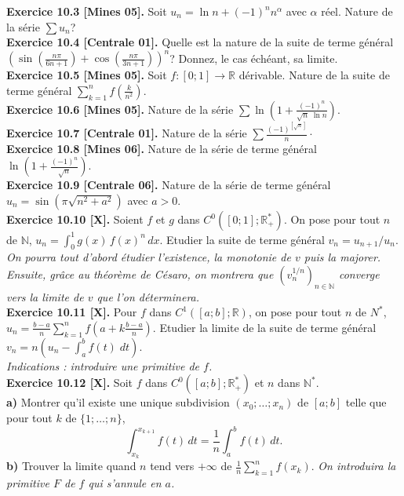 \documentclass[a4paper,12pt,francais]{article}
\newcommand{\field}[1]{\mathbb{#1}}
\newcommand{\N}{\field{N}}
\newcommand{\R}{\field{R}}
\begin{document}
\noindent
{\bf Exercice 10.3 [Mines 05].} Soit $u_n=\ln n+(-1)^nn^\alpha$ avec
$\alpha$ réel. Nature de la série $\sum u_n$?\\

\noindent
{\bf Exercice 10.4 [Centrale 01].} Quelle est la nature de la suite de
terme général 
$\left({
\sin \left({\frac{n\pi}{6n+1}}\right)
+\cos\left({\frac{n\pi}{3n+1}}\right)
}\right)^n$? Donnez, le cas échéant, sa limite.\\

\noindent
{\bf Exercice 10.5 [Mines 05].} Soit $f:[0;1] \rightarrow \R$
dérivable. Nature de la suite de terme général $\displaystyle 
\sum_{k=1}^n f\left({\frac{k}{n^2}}\right)$.\\

\noindent
{\bf Exercice 10.6 [Mines 05].} Nature de la série $\sum \ln \left({
1+\frac{(-1)^n}{\sqrt{n}\; \ln n}
}\right)$.\\

\noindent
{\bf Exercice 10.7 [Centrale 01].} Nature de la série $\sum \frac{(-1)^{[\sqrt{n}]}}{n}\cdot$\\

\noindent
{\bf Exercice 10.8 [Mines 06].} Nature de la série de terme général
$\ln \left(1+\frac{(-1)^n}{\sqrt{n}}\right)$.\\

\noindent
{\bf Exercice 10.9 [Centrale 06].} Nature de la série de terme général
$u_n=\sin( \pi \sqrt{n^2+a^2})$ avec $a>0$.\\

\noindent
{\bf Exercice 10.10 [X].} Soient $f$ et $g$ dans $C^0([0;1];\R_+^*)$. On
pose pour tout $n$ de $\N$, $u_n=\int_0^1 g(x) \, f(x)^n \,
dx$. Etudier la suite de terme général $v_n=u_{n+1}/u_n$.\\
{\it On pourra tout d'abord étudier l'existence, la monotonie de $v$ puis la majorer. Ensuite, grâce au théorème de Césaro, on montrera que $(v_n^{1/n})_{n\in \N}$ converge vers la limite de $v$ que l'on déterminera.}\\

\noindent
{\bf Exercice 10.11 [X].} Pour $f$ dans $C^1([a;b];\R)$, on pose pour tout
$n$ de $N^*$, $\displaystyle u_n=\frac{b-a}{n} \sum_{k=1}^n
f\left({a+k\frac{b-a}{n}}\right)$. Etudier la limite de la suite de
terme général $v_n=n\left({u_n-\int_a^b f(t) \; dt}\right).$\\
{\it Indications : introduire une primitive de $f$.}\\

\noindent
{\bf Exercice 10.12 [X].} Soit $f$ dans $C^0([a;b];\R_+^*)$ et $n$ dans
$\N^*$.\\
{\bf a)} Montrer qu'il existe une unique subdivision $(x_0;\dots;x_n)$
de $[a;b]$ telle que pour tout $k$ de $\{1;\dots;n\}$,
$$\int_{x_k}^{x_{k+1}} f(t)\, dt =\frac{1}{n} \int_a^b f(t)\, dt.$$
{\bf b)} Trouver la limite quand $n$ tend vers $+\infty$ de
$\displaystyle \frac{1}{n}\sum_{k=1}^n f(x_k).$ {\it On introduira la primitive $F$ de $f$ qui s'annule en $a$.}\\
\end{document}
